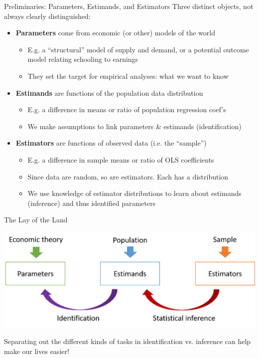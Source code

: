 \documentclass[11pt,english]{beamer}
\begin{document}
\begin{frame}{Preliminaries: Parameters, Estimands, and Estimators}
\vspace{-0.2cm}
Three distinct objects, not always clearly distinguished: \pause
{\small
\begin{itemize}
  \item \textbf{Parameters} come from economic (or other) models of the world
  \begin{itemize}
    \item E.g. a ``structural'' model of supply and demand, or a potential outcome model relating schooling to earnings\smallskip
    \item They set the target for empirical analyses: what we want to know
  \end{itemize}\pause
  
  \item \textbf{Estimands} are functions of the population data distribution 
  \begin{itemize}
    \item E.g. a difference in means or ratio of population regression coef's\smallskip
    \item We make assumptions to link parameters \& estimands (identification)
  \end{itemize}\pause
  
  \item \textbf{Estimators} are functions of observed data (i.e. the ``sample'')
  \begin{itemize}
    \item E.g. a difference in sample means or ratio of OLS coefficients \smallskip
    \item Since data are random, so are estimators. Each has a distribution \smallskip
    \item We use knowledge of estimator distributions to learn about estimands (inference) and thus identified parameters
  \end{itemize}
\end{itemize}
}
\end{frame}

\begin{frame}{The Lay of the Land}

\includegraphics[width=1\textwidth]{figures/BigPicture.png}
\medskip

Separating out the different kinds of tasks in identification vs. inference can help make our lives easier!

\end{frame}
\end{document}
